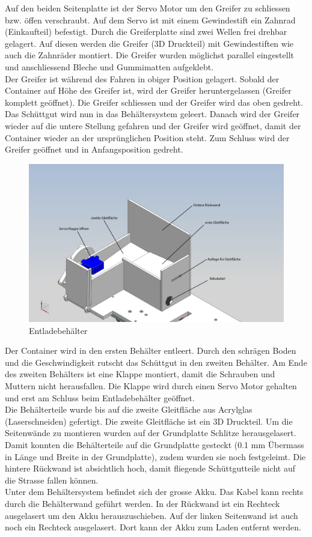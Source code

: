 Auf den beiden Seitenplatte ist der Servo Motor um den Greifer zu schliessen bzw. öffen verschraubt. Auf dem Servo ist mit einem Gewindestift ein Zahnrad (Einkaufteil) befestigt. Durch die Greiferplatte sind zwei Wellen frei drehbar gelagert. Auf diesen werden die Greifer (3D Druckteil) mit Gewindestiften wie auch die Zahnräder montiert. Die Greifer wurden möglichst parallel eingestellt und anschliessend Bleche und Gummimatten aufgeklebt.
\\
Der Greifer ist während des Fahren in obiger Position gelagert. Sobald der Container auf Höhe des Greifer ist, wird der Greifer heruntergelassen (Greifer komplett geöffnet). Die Greifer schliessen und der Greifer wird das oben gedreht. Das Schüttgut wird nun in das Behältersystem geleert. Danach wird der Greifer wieder auf die untere Stellung gefahren und der Greifer wird geöffnet, damit der Container wieder an der ursprünglichen Position steht. Zum Schluss wird der Greifer geöffnet und in Anfangsposition gedreht.\\[0.2cm]
\begin{figure}[H]
\centering
\includegraphics[width=1\textwidth]{03_Loesungskonzept/pictures/entladen11.png}
\caption{Entladebehälter}
\end{figure}
Der Container wird in den ersten Behälter entleert. Durch den schrägen Boden und die Geschwindigkeit rutscht das Schüttgut in den zweiten Behälter. Am Ende des zweiten Behälters ist eine Klappe montiert, damit die Schrauben und Muttern nicht herausfallen. Die Klappe wird durch einen Servo Motor gehalten und erst am Schluss beim Entladebehälter geöffnet.\\[0.2cm]
Die Behälterteile wurde bis auf die zweite Gleitfläche aus Acrylglas (Laserschneiden) gefertigt. Die zweite Gleitfläche ist ein 3D Druckteil.
Um die Seitenwände zu montieren wurden auf der Grundplatte Schlitze herausgelasert. Damit konnten die Behälterteile auf die Grundplatte gesteckt (0.1 mm Übermass in Länge und Breite in der Grundplatte), zudem wurden sie noch festgeleimt. Die hintere Rückwand ist absichtlich hoch, damit fliegende Schüttgutteile nicht auf die Strasse fallen können.\\[0.2cm] 
Unter dem Behältersystem befindet sich der grosse Akku. Das Kabel kann rechts durch die Behälterwand geführt werden. In der Rückwand ist ein Rechteck ausgelasert um den Akku herauszuschieben. Auf der linken Seitenwand ist auch noch ein Rechteck ausgelasert. Dort kann der Akku zum Laden entfernt werden.